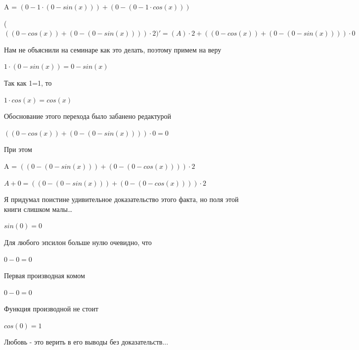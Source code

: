 \documentclass[12pt,a4paper,fleqn]{article}
\begin{document}
\begin{center}
\begin{center}
\begin{center}
\begin{center}
\begin{center}
\begin{center}
\begin{center}
\begin{center}
\begin{center}
\begin{center}
\begin{center}
\begin{center}
\begin{center}
\begin{center}
\begin{center}
\begin{center}
\begin{center}
\begin{center}
\begin{center}
\begin{center}
\begin{center}
\begin{center}
\begin{center}
\begin{center}
\begin{center}
\begin{center}
A = $(0-1 \cdot (0-sin(x)))+(0-(0-1 \cdot cos(x)))$\end{center}
\begin{center}
 ($((0-cos(x))+(0-(0-sin(x)))) \cdot 2)'
  = (A) \cdot 2+((0-cos(x))+(0-(0-sin(x)))) \cdot 0$\end{center}
Нам не объяснили на семинаре как это делать, поэтому примем на веру

\begin{center}
$1 \cdot (0-sin(x)) = 0-sin(x)$\end{center}
Так как 1=1, то\cite{link4}

\begin{center}
$1 \cdot cos(x) = cos(x)$\end{center}
Обоснование этого перехода было забанено редактурой

\begin{center}
$((0-cos(x))+(0-(0-sin(x)))) \cdot 0 = 0$\end{center}
При этом

\begin{center}
A = $((0-(0-sin(x)))+(0-(0-cos(x)))) \cdot 2$\end{center}
\begin{center}
$A+0 = ((0-(0-sin(x)))+(0-(0-cos(x)))) \cdot 2$\end{center}
Я придумал поистине удивительное доказательство этого факта, но поля этой книги слишком малы\ldots

\begin{center}
\begin{center}$sin(0) = 0$\end{center}
Для любого эпсилон больше нулю очевидно, что

\begin{center}
\begin{center}$0-0 = 0$\end{center}
Первая производная комом\cite{link2}

\begin{center}
\begin{center}$0-0 = 0$\end{center}
Функция производной не стоит\cite{link2}

\begin{center}
\begin{center}$cos(0) = 1$\end{center}
Любовь - это верить в его выводы без доказательств...


\end{center}
\end{center}
\end{center}
\end{center}
\end{center}
\end{center}
\end{center}
\end{center}
\end{center}
\end{center}
\end{center}
\end{center}
\end{center}
\end{center}
\end{center}
\end{center}
\end{center}
\end{center}
\end{center}
\end{center}
\end{center}
\end{center}
\end{center}
\end{center}
\end{center}
\end{center}
\end{center}
\end{center}
\end{center}
\end{document}
